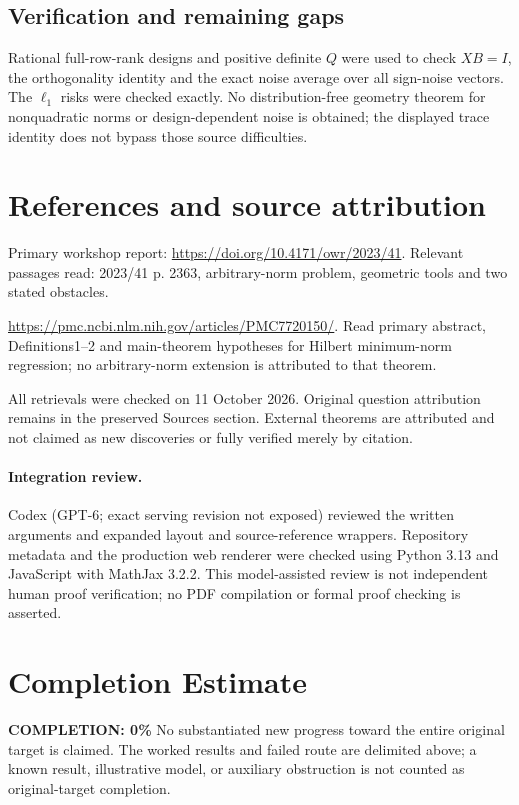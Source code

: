 \documentclass[11pt]{article}
\begin{document}
\subsection{Verification and remaining gaps}
Rational full-row-rank designs and positive definite $Q$ were used to check $XB=I$, the orthogonality identity and the exact noise average over all sign-noise vectors. The $\ell_1$ risks were checked exactly. No distribution-free geometry theorem for nonquadratic norms or design-dependent noise is obtained; the displayed trace identity does not bypass those source difficulties.

\section{References and source attribution}
Primary workshop report: \url{https://doi.org/10.4171/owr/2023/41}. Relevant passages read: 2023/41 p. 2363, arbitrary-norm problem, geometric tools and two stated obstacles.

\url{https://pmc.ncbi.nlm.nih.gov/articles/PMC7720150/}. Read primary abstract, Definitions1--2 and main-theorem hypotheses for Hilbert minimum-norm regression; no arbitrary-norm extension is attributed to that theorem.

All retrievals were checked on 11 October 2026. Original question attribution remains in the preserved Sources section. External theorems are attributed and not claimed as new discoveries or fully verified merely by citation.


\paragraph{Integration review.} Codex (GPT-6; exact serving revision not exposed) reviewed the written arguments and expanded layout and source-reference wrappers. Repository metadata and the production web renderer were checked using Python 3.13 and JavaScript with MathJax 3.2.2. This model-assisted review is not independent human proof verification; no PDF compilation or formal proof checking is asserted.

\section{Completion Estimate}
\noindent\textbf{COMPLETION: 0\%}
No substantiated new progress toward the entire original target is claimed. The worked results and failed route are delimited above; a known result, illustrative model, or auxiliary obstruction is not counted as original-target completion.
\end{document}
